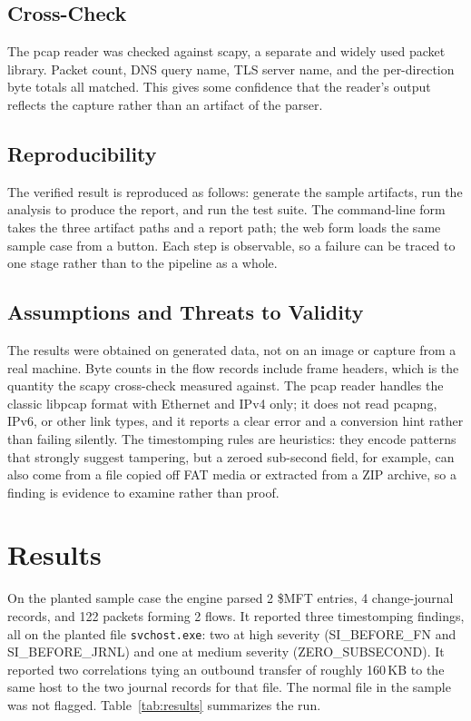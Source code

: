 \documentclass[12pt,onecolumn]{IEEEtran}
\begin{document}
\subsection{Cross-Check}
The pcap reader was checked against scapy, a separate and widely used packet library. Packet count, DNS query name, TLS server name, and the per-direction byte totals all matched. This gives some confidence that the reader's output reflects the capture rather than an artifact of the parser.

\subsection{Reproducibility}
The verified result is reproduced as follows: generate the sample artifacts, run the analysis to produce the report, and run the test suite. The command-line form takes the three artifact paths and a report path; the web form loads the same sample case from a button. Each step is observable, so a failure can be traced to one stage rather than to the pipeline as a whole.

\subsection{Assumptions and Threats to Validity}
The results were obtained on generated data, not on an image or capture from a real machine. Byte counts in the flow records include frame headers, which is the quantity the scapy cross-check measured against. The pcap reader handles the classic libpcap format with Ethernet and IPv4 only; it does not read pcapng, IPv6, or other link types, and it reports a clear error and a conversion hint rather than failing silently. The timestomping rules are heuristics: they encode patterns that strongly suggest tampering, but a zeroed sub-second field, for example, can also come from a file copied off FAT media or extracted from a ZIP archive, so a finding is evidence to examine rather than proof.

\section{Results}

On the planted sample case the engine parsed 2 \$MFT entries, 4 change-journal records, and 122 packets forming 2 flows. It reported three timestomping findings, all on the planted file \texttt{svchost.exe}: two at high severity (SI\_BEFORE\_FN and SI\_BEFORE\_JRNL) and one at medium severity (ZERO\_SUBSECOND). It reported two correlations tying an outbound transfer of roughly 160\,KB to the same host to the two journal records for that file. The normal file in the sample was not flagged. Table~\ref{tab:results} summarizes the run.
\end{document}
